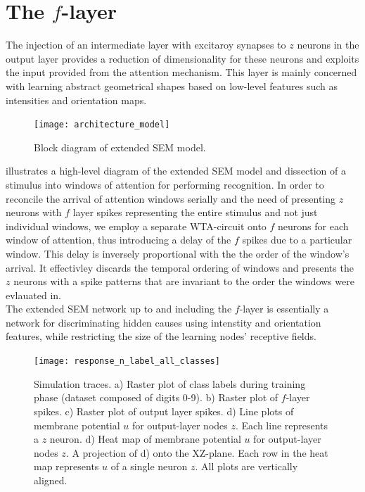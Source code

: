 \documentclass{report}
\begin{document}
\section{The $f$-layer}

The injection of an intermediate layer with excitaroy synapses to $z$ neurons in the output layer provides a reduction of dimensionality for these neurons and exploits the input provided from the attention mechanism. This layer is mainly concerned with learning abstract geometrical shapes based on low-level features such as intensities and orientation maps.\\

\begin{figure}[ht]
\centering
\texttt{[image: architecture\_model]}
\caption{Block diagram of extended SEM model.
\label{fig:architecture_model}}
\end{figure}

 illustrates a high-level diagram of the extended SEM model and dissection of a stimulus into windows of attention for performing recognition. In order to reconcile the arrival of attention windows serially and the need of presenting $z$ neurons with $f$ layer spikes representing the entire stimulus and not just individual windows, we employ a separate WTA-circuit onto $f$ neurons for each window of attention, thus introducing a delay of the $f$ spikes due to a particular window. This delay is inversely proportional with the the order of the window's arrival. It effectivley discards the temporal ordering of windows and presents the $z$ neurons with a spike patterns that are invariant to the order the windows were evlauated in.\\

The extended SEM network up to and including the $f$-layer is essentially a network for discriminating hidden causes using intenstity and orientation features, while restricting the size of the learning nodes' receptive fields.\\

\begin{figure}[ht]
\centering
\texttt{[image: response\_n\_label\_all\_classes]}
\caption{Simulation traces. a) Raster plot of class labels during training phase (dataset composed of digits 0-9). b) Raster plot of $f$-layer spikes. c) Raster plot of output layer spikes. d) Line plots of membrane potential $u$ for output-layer nodes $z$. Each line represents a $z$ neuron. d) Heat map of membrane potential $u$ for output-layer nodes $z$. A projection of d) onto the XZ-plane. Each row in the heat map represents $u$ of a single neuron $z$. All plots are vertically aligned.
\label{fig:response_n_label_all_classes}}
\end{figure}
\end{document}
